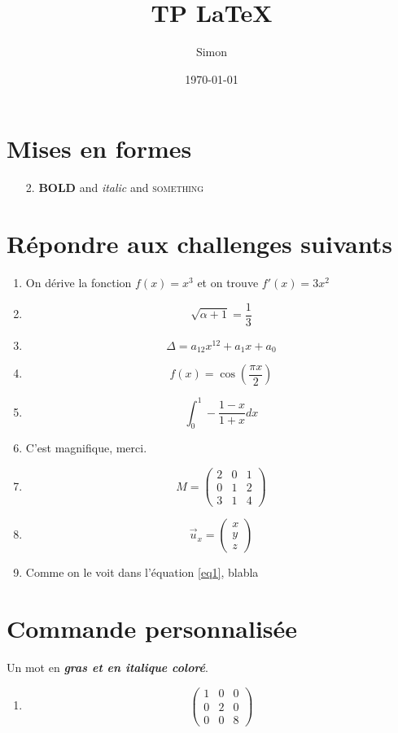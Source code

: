 \documentclass[11pt,a4paper]{article}
\title{TP {\LaTeX}}
\date{\today}
\author{Simon \bsc{Léonard}}
\newcommand{\grasitalique}[1]{\textit{\textbf{\color{blue} #1}}}
\newcommand{\diagonale}[3]{
\[
\begin{pmatrix}
	#1 & 0 & 0\\
	0 & #2 & 0\\
	0 & 0 & #3
\end{pmatrix}
\]
}
\begin{document}
\maketitle
\tableofcontents
\newpage

\section{Mises en formes}
	\begin{enumerate}
		\item[2.] \textbf{BOLD} and \textit{italic} and \textsc{something}
	\end{enumerate}

\section{Répondre aux challenges suivants}
	\begin{enumerate}
		\item On dérive la fonction \(f(x)=x^3\) et on trouve \(f'(x)=3x^2\)

		\item
		\[\sqrt{\alpha + 1} = \frac{1}{3}\]

		\item
		\[\Delta = a_{12} x^{12} + a_1 x + a_0\]

		\item
		\begin{equation} \label{eq1}
			f(x)= \cos{\left(\frac{\pi x}{2}\right)}
		\end{equation}

		\item
		\begin{equation}
			\int_0^1 -\frac{1-x}{1+x}dx
		\end{equation}

		\item
		C'est magnifique, merci.

		\item
		\[
		M=
		\begin{pmatrix}
		2 & 0 & 1\\
		0 & 1 & 2\\
		3 & 1 & 4 
		\end{pmatrix}
		\]

		\item
		\[\vec{u}_x=
		\begin{pmatrix}
			x\\	
			y\\
			z
		\end{pmatrix}
		\]

		\item
		Comme on le voit dans l'équation \ref{eq1}, blabla
	\end{enumerate}

\section{Commande personnalisée}
	Un mot en \grasitalique{gras et en italique coloré}.
	\begin{enumerate}
		\item \diagonale{1}{2}{8}
	\end{enumerate}
\end{document}
